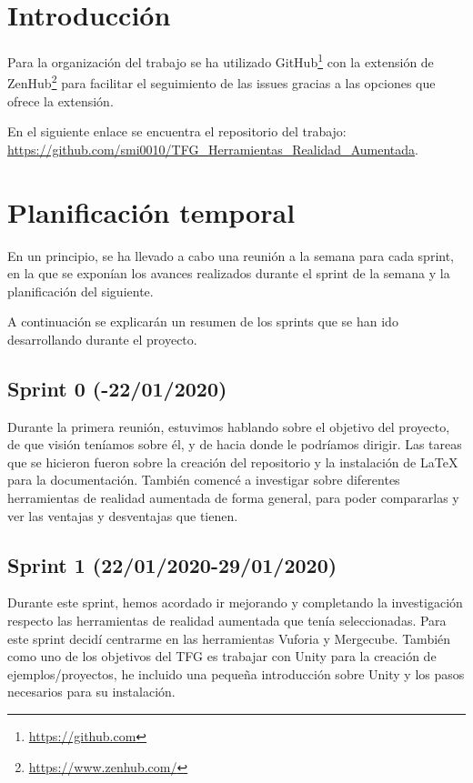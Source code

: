 
\section{Introducción}
 Para la organización del trabajo se ha utilizado GitHub\footnote{\url{https://github.com}} con la extensión de ZenHub\footnote{\url{https://www.zenhub.com/}} para facilitar el seguimiento de las issues gracias a las opciones que ofrece la extensión.
 
En el siguiente enlace se encuentra el repositorio del trabajo: \url{https://github.com/smi0010/TFG_Herramientas_Realidad_Aumentada}.
\section{Planificación temporal}

En un principio, se ha llevado a cabo una reunión a la semana para cada sprint, en la que se exponían los avances realizados durante el sprint de la semana y la planificación del siguiente.

A continuación se explicarán un resumen de los sprints que se han ido desarrollando durante el proyecto.

\subsection{Sprint 0 (-22/01/2020)}
Durante la primera reunión, estuvimos hablando sobre el objetivo del proyecto, de que visión teníamos sobre él, y de hacia donde le podríamos dirigir.
Las tareas que se hicieron fueron sobre la creación del repositorio y la instalación de \LaTeX{} para la documentación. También comencé a investigar sobre diferentes herramientas de realidad aumentada de forma general, para poder compararlas y ver las ventajas y desventajas que tienen.

\subsection{Sprint 1 (22/01/2020-29/01/2020)}
Durante este sprint, hemos acordado ir mejorando y completando  la investigación respecto las herramientas de realidad aumentada que tenía seleccionadas.
Para este sprint decidí centrarme en las herramientas Vuforia y Mergecube.
También como uno de los objetivos del TFG es trabajar con Unity para la creación de ejemplos/proyectos, he incluido una pequeña introducción sobre Unity y los pasos necesarios para su instalación.
